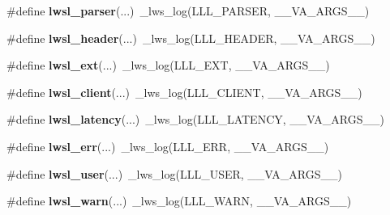 \begin{DoxyCompactItemize}
\item 
\mbox{\label{group__log_gaee051a14945bec746ed3b527f384dc72}} 
\#define {\bfseries lwsl\+\_\+parser}(...)~\+\_\+lws\+\_\+log(L\+L\+L\+\_\+\+P\+A\+R\+S\+ER, \+\_\+\+\_\+\+V\+A\+\_\+\+A\+R\+G\+S\+\_\+\+\_\+)
\item 
\mbox{\label{group__log_gaab72aa186eff075fb3d229cb99a35434}} 
\#define {\bfseries lwsl\+\_\+header}(...)~\+\_\+lws\+\_\+log(L\+L\+L\+\_\+\+H\+E\+A\+D\+ER, \+\_\+\+\_\+\+V\+A\+\_\+\+A\+R\+G\+S\+\_\+\+\_\+)
\item 
\mbox{\label{group__log_ga8e0877b452d80bc154793ad81bfce742}} 
\#define {\bfseries lwsl\+\_\+ext}(...)~\+\_\+lws\+\_\+log(L\+L\+L\+\_\+\+E\+XT, \+\_\+\+\_\+\+V\+A\+\_\+\+A\+R\+G\+S\+\_\+\+\_\+)
\item 
\mbox{\label{group__log_ga181ea1ed9ba604e493ce092850d9da90}} 
\#define {\bfseries lwsl\+\_\+client}(...)~\+\_\+lws\+\_\+log(L\+L\+L\+\_\+\+C\+L\+I\+E\+NT, \+\_\+\+\_\+\+V\+A\+\_\+\+A\+R\+G\+S\+\_\+\+\_\+)
\item 
\mbox{\label{group__log_gab5842ee4ec5f763d057869e083ff1cb0}} 
\#define {\bfseries lwsl\+\_\+latency}(...)~\+\_\+lws\+\_\+log(L\+L\+L\+\_\+\+L\+A\+T\+E\+N\+CY, \+\_\+\+\_\+\+V\+A\+\_\+\+A\+R\+G\+S\+\_\+\+\_\+)
\item 
\mbox{\label{group__log_gad44c15d00076052a398244035a7dbb56}} 
\#define {\bfseries lwsl\+\_\+err}(...)~\+\_\+lws\+\_\+log(L\+L\+L\+\_\+\+E\+RR, \+\_\+\+\_\+\+V\+A\+\_\+\+A\+R\+G\+S\+\_\+\+\_\+)
\item 
\mbox{\label{group__log_ga9aad07786eb4b3189b0eac919b2a960f}} 
\#define {\bfseries lwsl\+\_\+user}(...)~\+\_\+lws\+\_\+log(L\+L\+L\+\_\+\+U\+S\+ER, \+\_\+\+\_\+\+V\+A\+\_\+\+A\+R\+G\+S\+\_\+\+\_\+)
\item 
\mbox{\label{group__log_ga1bcd293826c0a91d6e7ac3c54db72885}} 
\#define {\bfseries lwsl\+\_\+warn}(...)~\+\_\+lws\+\_\+log(L\+L\+L\+\_\+\+W\+A\+RN, \+\_\+\+\_\+\+V\+A\+\_\+\+A\+R\+G\+S\+\_\+\+\_\+)
\item 
\mbox{\label{group__log_ga86b3c56c638569eb93919c52a1d5dfaf}} 

\end{DoxyCompactItemize}
